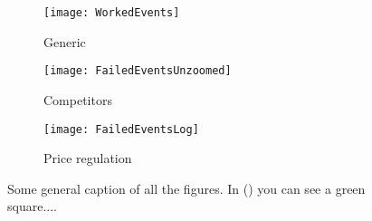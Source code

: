 \begin{figure}
    \centering
    \begin{subfigure}[]{0.45\textwidth}
        \centering
        \texttt{[image: WorkedEvents]} 
        \caption{Generic}
        \label{fig:timing1}
    \end{subfigure}
    \hfill
    \begin{subfigure}[]{0.45\textwidth}
        \centering
        \texttt{[image: FailedEventsUnzoomed]} 
        \caption{Competitors}
        \label{fig:timing2}
    \end{subfigure}

    \vspace{1cm}
    \begin{subfigure}[]{0.45\textwidth}
        \centering
        \texttt{[image: FailedEventsLog]} 
        \caption{Price regulation}
        \label{fig:timing3}
    \end{subfigure}
    \hfill
    \begin{subfigure}[]{0.45\textwidth}
    \end{subfigure}
    \caption{Some general caption of all the figures. In () you can see a  green square....}
\end{figure}





















